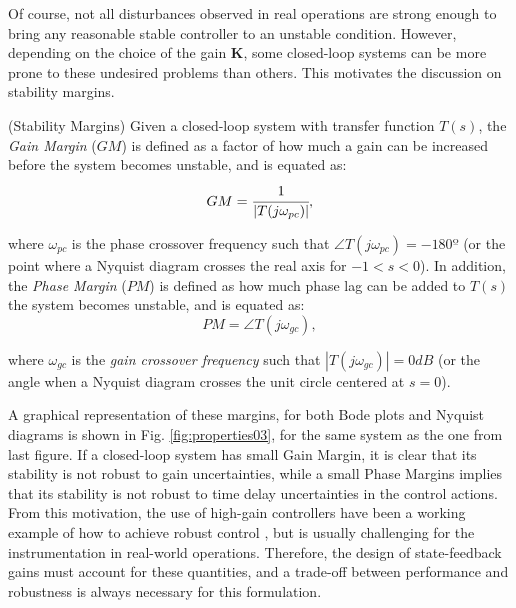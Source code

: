\documentclass[a4paper,11pt]{book}
\numberwithin{figure}{chapter}
\numberwithin{equation}{chapter}
\numberwithin{table}{chapter}
\theoremstyle{definition}
\newtheorem{definition}{Definition}[chapter]
\newcounter{boxed-theorem}
\newcounter{boxed-lemma}
\newcounter{boxed-definition}
\newenvironment{boxed-definition}[1]
{\colorlet{shadecolor}{pastelYellow!15} \begin{shaded} \begin{definition}{#1}}
{\end{definition} \end{shaded}}
\newcounter{boxed-example}
\begin{document}
Of course, not all disturbances observed in real operations are strong enough to bring any reasonable stable controller to an unstable condition. However, depending on the choice of the gain $\bm{K}$, some closed-loop systems can be more prone to these undesired problems than others. This motivates the discussion on stability margins.

\begin{boxed-definition}{(Stability Margins)}
    Given a closed-loop system with transfer function $T(s)$, the \textit{Gain Margin} ($GM$) is defined as a factor of how much a gain can be increased before the system becomes unstable, and is equated as:
    \begin{equation}
        GM = \cfrac{1}{|T(j \omega_{pc})|}
    ,\end{equation}
    
    \noindent where $\omega_{pc}$ is the phase crossover frequency such that $\angle T(j\omega_{pc}) = -180º$ (or the point where a Nyquist diagram crosses the real axis for $-1 < s < 0$). In addition, the \textit{Phase Margin} ($PM$) is defined as how much phase lag can be added to $T(s)$ the system becomes unstable, and is equated as:
    \begin{equation}
        PM = \angle T(j \omega_{gc})
    ,\end{equation}
    
    \noindent where $\omega_{gc}$ is the \textit{gain crossover frequency} such that $| T(j\omega_{gc}) | = 0 dB$ (or the angle when a Nyquist diagram crosses the unit circle centered at $s = 0$). 
\end{boxed-definition}

A graphical representation of these margins, for both Bode plots and Nyquist diagrams is shown in Fig. \ref{fig:properties03}, for the same system as the one from last figure. If a closed-loop system has small Gain Margin, it is clear that its stability is not robust to gain uncertainties, while a small Phase Margins implies that its stability is not robust to time delay uncertainties in the control actions. From this motivation, the use of high-gain controllers have been a working example of how to achieve robust control \cite{Khalil:2005, Mahmoud:2002}, but is usually challenging for the instrumentation in real-world operations. Therefore, the design of state-feedback gains must account for these quantities, and a trade-off between performance and robustness is always necessary for this formulation. 
\end{document}

